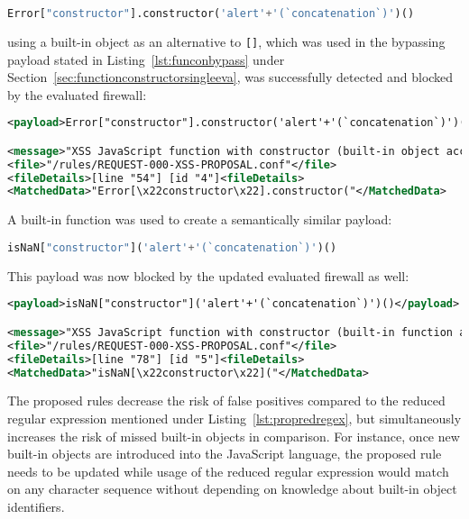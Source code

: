 \begin{lstlisting}[style=basicStyle, language=Python]
Error["constructor"].constructor('alert'+'(`concatenation`)')()
\end{lstlisting}
using a built-in object as an alternative to \verb|[]|, which was used in the bypassing payload stated in Listing~\ref{lst:funconbypass} under Section~\ref{sec:functionconstructorsingleeva}, was successfully detected and blocked by the evaluated firewall:

\begin{lstlisting}[style=ruleStyle, language=XML, caption=Function() constructor bypass using a built-in object blocked, label={lst:constructorsblockedbio}]
<payload>Error["constructor"].constructor('alert'+'(`concatenation`)')()</payload>

<message>"XSS JavaScript function with constructor (built-in object access)"</message>
<file>"/rules/REQUEST-000-XSS-PROPOSAL.conf"</file>
<fileDetails>[line "54"] [id "4"]<fileDetails>
<MatchedData>"Error[\x22constructor\x22].constructor("</MatchedData>
\end{lstlisting}
A built-in function was used to create a semantically similar payload: 

\begin{lstlisting}[style=basicStyle, language=Python]
isNaN["constructor"]('alert'+'(`concatenation`)')()
\end{lstlisting}
This payload was now blocked by the updated evaluated firewall as well:

\begin{lstlisting}[style=ruleStyle, language=XML, caption=Function() constructor bypass using a built-in function blocked, label={lst:constructorsblockedbif}]
<payload>isNaN["constructor"]('alert'+'(`concatenation`)')()</payload>

<message>"XSS JavaScript function with constructor (built-in function access)"</message>
<file>"/rules/REQUEST-000-XSS-PROPOSAL.conf"</file>
<fileDetails>[line "78"] [id "5"]<fileDetails>
<MatchedData>"isNaN[\x22constructor\x22]("</MatchedData>
\end{lstlisting}
The proposed rules decrease the risk of false positives compared to the reduced regular expression mentioned under Listing~\ref{lst:propredregex}, but simultaneously increases the risk of missed built-in objects in comparison. For instance, once new built-in objects are introduced into the JavaScript language, the proposed rule needs to be updated while usage of the reduced regular expression would match on any character sequence without depending on knowledge about built-in object identifiers.

